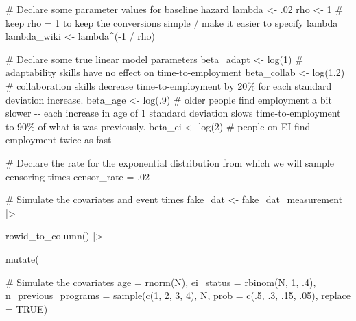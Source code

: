 \documentclass[
  letterpaper,
  DIV=11,
  numbers=noendperiod]{scrreprt}
\newenvironment{Shaded}{\begin{snugshade}}{\end{snugshade}}
\newcommand{\AttributeTok}[1]{\textcolor[rgb]{0.40,0.45,0.13}{#1}}
\newcommand{\CommentTok}[1]{\textcolor[rgb]{0.37,0.37,0.37}{#1}}
\newcommand{\ConstantTok}[1]{\textcolor[rgb]{0.56,0.35,0.01}{#1}}
\newcommand{\DecValTok}[1]{\textcolor[rgb]{0.68,0.00,0.00}{#1}}
\newcommand{\FloatTok}[1]{\textcolor[rgb]{0.68,0.00,0.00}{#1}}
\newcommand{\FunctionTok}[1]{\textcolor[rgb]{0.28,0.35,0.67}{#1}}
\newcommand{\NormalTok}[1]{\textcolor[rgb]{0.00,0.23,0.31}{#1}}
\newcommand{\OtherTok}[1]{\textcolor[rgb]{0.00,0.23,0.31}{#1}}
\newcommand{\SpecialCharTok}[1]{\textcolor[rgb]{0.37,0.37,0.37}{#1}}
\begin{document}
\begin{Shaded}
\begin{Highlighting}[]
\CommentTok{\# Declare some parameter values for baseline hazard}
\NormalTok{lambda }\OtherTok{\textless{}{-}}\NormalTok{ .}\DecValTok{02}
\NormalTok{rho }\OtherTok{\textless{}{-}} \DecValTok{1} \CommentTok{\# keep rho = 1 to keep the conversions simple / make it easier to specify lambda}
\NormalTok{lambda\_wiki }\OtherTok{\textless{}{-}}\NormalTok{ lambda}\SpecialCharTok{\^{}}\NormalTok{(}\SpecialCharTok{{-}}\DecValTok{1} \SpecialCharTok{/}\NormalTok{ rho) }

\CommentTok{\# Declare some true linear model parameters}
\NormalTok{beta\_adapt }\OtherTok{\textless{}{-}} \FunctionTok{log}\NormalTok{(}\DecValTok{1}\NormalTok{) }\CommentTok{\# adaptability skills have no effect on time{-}to{-}employment}
\NormalTok{beta\_collab }\OtherTok{\textless{}{-}} \FunctionTok{log}\NormalTok{(}\FloatTok{1.2}\NormalTok{) }\CommentTok{\# collaboration skills decrease time{-}to{-}employment by 20\% for each standard deviation increase.}
\NormalTok{beta\_age }\OtherTok{\textless{}{-}} \FunctionTok{log}\NormalTok{(.}\DecValTok{9}\NormalTok{) }\CommentTok{\# older people find employment a bit slower {-}{-} each increase in age of 1 standard deviation slows time{-}to{-}employment to 90\% of what is was previously.}
\NormalTok{beta\_ei }\OtherTok{\textless{}{-}} \FunctionTok{log}\NormalTok{(}\DecValTok{2}\NormalTok{) }\CommentTok{\# people on EI find employment twice as fast }

\CommentTok{\# Declare the rate for the exponential distribution from which we will sample censoring times}
\NormalTok{censor\_rate }\OtherTok{=}\NormalTok{ .}\DecValTok{02}

\CommentTok{\# Simulate the covariates and event times}
\NormalTok{fake\_dat }\OtherTok{\textless{}{-}}\NormalTok{ fake\_dat\_measurement }\SpecialCharTok{|\textgreater{}}

  \FunctionTok{rowid\_to\_column}\NormalTok{() }\SpecialCharTok{|\textgreater{}}

  \FunctionTok{mutate}\NormalTok{(}

    \CommentTok{\# Simulate the covariates}
    \AttributeTok{age =} \FunctionTok{rnorm}\NormalTok{(N), }
    \AttributeTok{ei\_status =} \FunctionTok{rbinom}\NormalTok{(N, }\DecValTok{1}\NormalTok{, .}\DecValTok{4}\NormalTok{),}
    \AttributeTok{n\_previous\_programs =} \FunctionTok{sample}\NormalTok{(}\FunctionTok{c}\NormalTok{(}\DecValTok{1}\NormalTok{, }\DecValTok{2}\NormalTok{, }\DecValTok{3}\NormalTok{, }\DecValTok{4}\NormalTok{), N, }\AttributeTok{prob =} \FunctionTok{c}\NormalTok{(.}\DecValTok{5}\NormalTok{, .}\DecValTok{3}\NormalTok{, .}\DecValTok{15}\NormalTok{, .}\DecValTok{05}\NormalTok{), }\AttributeTok{replace =} \ConstantTok{TRUE}\NormalTok{)}


\end{Highlighting}
\end{Shaded}
\end{document}
